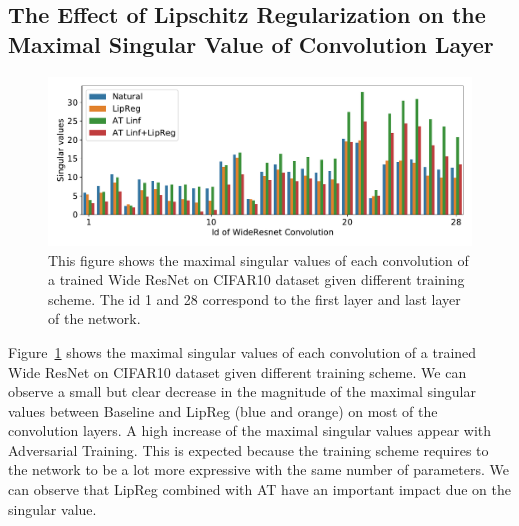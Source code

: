 \subsection{The Effect of Lipschitz Regularization on the Maximal Singular Value of Convolution Layer}

\begin{figure}[htb]
    \centering
    \includegraphics[scale=0.55]{figures/chapter4/singular_values.pdf}
    \caption{This figure shows the maximal singular values of each convolution of a trained Wide ResNet on CIFAR10 dataset given different training scheme. The id 1 and 28 correspond to the first layer and last layer of the network.}
    \label{fig:singular_values}
\end{figure}%

Figure~\ref{fig:singular_values} shows the maximal singular values of each convolution of a trained Wide ResNet on CIFAR10 dataset given different training scheme. We can observe a small but clear decrease in the magnitude of the maximal singular values between Baseline and LipReg (blue and orange) on most of the convolution layers. A high increase of the maximal singular values appear with Adversarial Training. This is expected because the training scheme requires to the network to be a lot more expressive with the same number of parameters. We can observe that LipReg combined with AT have an important impact due on the singular value. 


